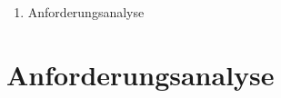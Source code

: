 
\addchap{\langanhang}

{\Large
\begin{enumerate}[label=\Alph*.]
	\item Anforderungsanalyse
\end{enumerate}
}
\pagebreak

\section*{Anforderungsanalyse}\label{sec:Anforderungsanalyse}

\pagebreak


